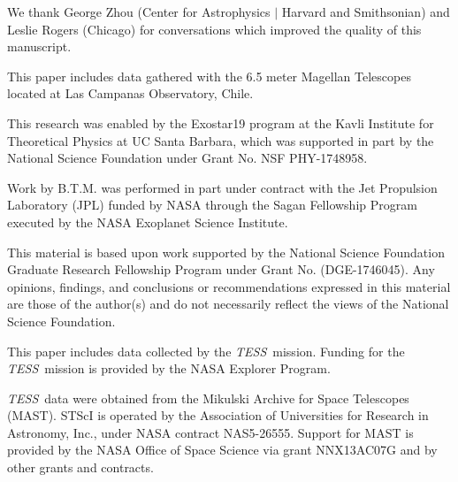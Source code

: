 \documentclass[twocolumn]{aastex63}
\newcommand{\tess}{{\it TESS}}
\begin{document}
\acknowledgements

We thank George Zhou (Center for Astrophysics $|$ Harvard and Smithsonian) and Leslie Rogers (Chicago) for conversations which improved the quality of this manuscript.

This paper includes data gathered with the 6.5 meter Magellan Telescopes located at Las Campanas Observatory, Chile.


This research was enabled by the Exostar19 program at the Kavli Institute for Theoretical Physics at UC Santa Barbara, which was supported in part by the National Science Foundation under Grant No. NSF PHY-1748958.


Work by B.T.M. was performed in part under contract with the Jet
Propulsion Laboratory (JPL) funded by NASA through
the Sagan Fellowship Program executed by the NASA
Exoplanet Science Institute.

This material is based upon work supported by the National Science Foundation Graduate Research Fellowship Program under Grant No. (DGE-1746045). Any opinions, findings, and conclusions or recommendations expressed in this material are those of the author(s) and do not necessarily reflect the views of the National Science Foundation.



This paper includes data collected by the \tess\ mission. Funding for the \tess\ mission is provided by the NASA Explorer Program.

\tess\ data were obtained from the Mikulski Archive for Space Telescopes
(MAST).
STScI is operated by the Association of Universities for Research in
Astronomy, Inc., under NASA contract NAS5-26555.
Support for MAST is provided by the NASA Office of Space Science via grant
NNX13AC07G and by other grants and contracts.














\end{document}
